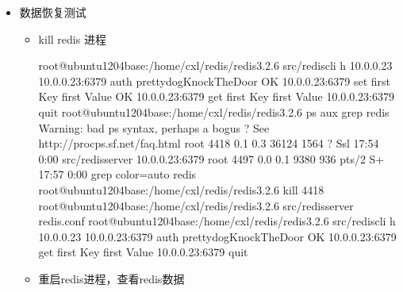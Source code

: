 \documentclass[a4paper,10pt,english]{sphinxmanual}
\begin{document}
\begin{itemize}
\begin{itemize}
\end{itemize}

\item {} 
数据恢复测试
\begin{itemize}
\item {} 
kill redis 进程

\begin{sphinxVerbatim}[commandchars=\\\{\}]
root@ubuntu1204base:/home/cxl/redis/redis\PYGZhy{}3.2.6\PYGZsh{} src/redis\PYGZhy{}cli \PYGZhy{}h 10.0.0.23
10.0.0.23:6379\PYGZgt{} auth prettydogKnockTheDoor
OK
10.0.0.23:6379\PYGZgt{} set \PYGZdq{}first Key\PYGZdq{} \PYGZdq{}first Value\PYGZdq{}
OK
10.0.0.23:6379\PYGZgt{} get \PYGZdq{}first Key\PYGZdq{}
\PYGZdq{}first Value\PYGZdq{}
10.0.0.23:6379\PYGZgt{} quit
root@ubuntu1204base:/home/cxl/redis/redis\PYGZhy{}3.2.6\PYGZsh{} ps \PYGZhy{}aux \textbar{}grep redis
Warning: bad ps syntax, perhaps a bogus \PYGZsq{}\PYGZhy{}\PYGZsq{}? See http://procps.sf.net/faq.html
root      4418  0.1  0.3  36124  1564 ?        Ssl  17:54   0:00 src/redis\PYGZhy{}server 10.0.0.23:6379
root      4497  0.0  0.1   9380   936 pts/2    S+   17:57   0:00 grep \PYGZhy{}\PYGZhy{}color=auto redis
root@ubuntu1204base:/home/cxl/redis/redis\PYGZhy{}3.2.6\PYGZsh{} kill 4418
root@ubuntu1204base:/home/cxl/redis/redis\PYGZhy{}3.2.6\PYGZsh{} src/redis\PYGZhy{}server redis.conf
root@ubuntu1204base:/home/cxl/redis/redis\PYGZhy{}3.2.6\PYGZsh{} src/redis\PYGZhy{}cli \PYGZhy{}h 10.0.0.23
10.0.0.23:6379\PYGZgt{} auth prettydogKnockTheDoor
OK
10.0.0.23:6379\PYGZgt{} get \PYGZdq{}first Key\PYGZdq{}
\PYGZdq{}first Value\PYGZdq{}
10.0.0.23:6379\PYGZgt{} quit
\end{sphinxVerbatim}

\item {} 
重启redis进程，查看redis数据


\end{itemize}
\end{itemize}
\end{document}
